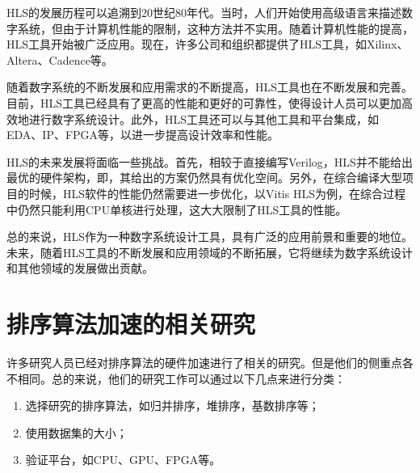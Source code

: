 HLS的发展历程可以追溯到20世纪80年代。当时，人们开始使用高级语言来描述数字系统，但由于计算机性能的限制，这种方法并不实用。随着计算机性能的提高，HLS工具开始被广泛应用。现在，许多公司和组织都提供了HLS工具，如Xilinx、Altera、Cadence等。\cite{hlsbook}\cite{pp4fpgas}

随着数字系统的不断发展和应用需求的不断提高，HLS工具也在不断发展和完善。目前，HLS工具已经具有了更高的性能和更好的可靠性，使得设计人员可以更加高效地进行数字系统设计。此外，HLS工具还可以与其他工具和平台集成，如EDA、IP、FPGA等，以进一步提高设计效率和性能。

HLS的未来发展将面临一些挑战。首先，相较于直接编写Verilog，HLS并不能给出最优的硬件架构，即，其给出的方案仍然具有优化空间。另外，在综合编译大型项目的时候，HLS软件的性能仍然需要进一步优化，以Vitis HLS为例，在综合过程中仍然只能利用CPU单核进行处理，这大大限制了HLS工具的性能。\cite{cong2022fpga}

总的来说，HLS作为一种数字系统设计工具，具有广泛的应用前景和重要的地位。未来，随着HLS工具的不断发展和应用领域的不断拓展，它将继续为数字系统设计和其他领域的发展做出贡献。


\section{排序算法加速的相关研究}

许多研究人员已经对排序算法的硬件加速进行了相关的研究。但是他们的侧重点各不相同。总的来说，他们的研究工作可以通过以下几点来进行分类：
\begin{enumerate}
    \item 选择研究的排序算法，如归并排序，堆排序，基数排序等；
    \item 使用数据集的大小；
    \item 验证平台，如CPU、GPU、FPGA等。
\end{enumerate}

